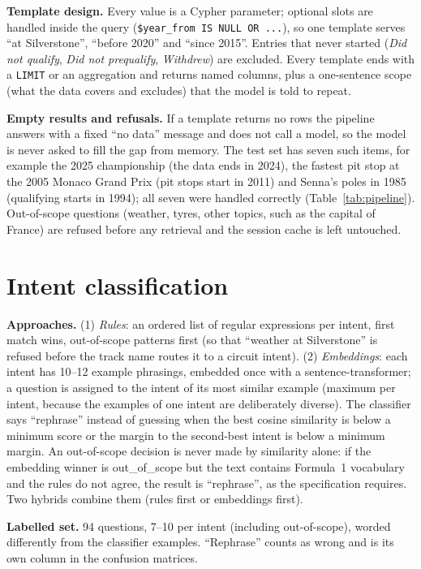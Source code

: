 \documentclass[10pt,a4paper]{article}
\newcommand{\code}[1]{\texttt{#1}}
\begin{document}
\textbf{Template design.} Every value is a Cypher parameter; optional slots are handled inside the query (\code{\$year\_from IS NULL OR ...}), so one template serves ``at Silverstone'', ``before 2020'' and ``since 2015''. Entries that never started (\emph{Did not qualify}, \emph{Did not prequalify}, \emph{Withdrew}) are excluded. Every template ends with a \code{LIMIT} or an aggregation and returns named columns, plus a one-sentence scope (what the data covers and excludes) that the model is told to repeat.

\textbf{Empty results and refusals.} If a template returns no rows the pipeline answers with a fixed ``no data'' message and does not call a model, so the model is never asked to fill the gap from memory. The test set has seven such items, for example the 2025 championship (the data ends in 2024), the fastest pit stop at the 2005 Monaco Grand Prix (pit stops start in 2011) and Senna's poles in 1985 (qualifying starts in 1994); all seven were handled correctly (Table~\ref{tab:pipeline}). Out-of-scope questions (weather, tyres, other topics, such as the capital of France) are refused before any retrieval and the session cache is left untouched.

\section{Intent classification}

\textbf{Approaches.} (1) \emph{Rules}: an ordered list of regular expressions per intent, first match wins, out-of-scope patterns first (so that ``weather at Silverstone'' is refused before the track name routes it to a circuit intent). (2) \emph{Embeddings}: each intent has 10--12 example phrasings, embedded once with a sentence-transformer; a question is assigned to the intent of its most similar example (maximum per intent, because the examples of one intent are deliberately diverse). The classifier says ``rephrase'' instead of guessing when the best cosine similarity is below a minimum score or the margin to the second-best intent is below a minimum margin. An out-of-scope decision is never made by similarity alone: if the embedding winner is out\_of\_scope but the text contains Formula~1 vocabulary and the rules do not agree, the result is ``rephrase'', as the specification requires. Two hybrids combine them (rules first or embeddings first).

\textbf{Labelled set.} 94 questions, 7--10 per intent (including out-of-scope), worded differently from the classifier examples. ``Rephrase'' counts as wrong and is its own column in the confusion matrices.
\end{document}
